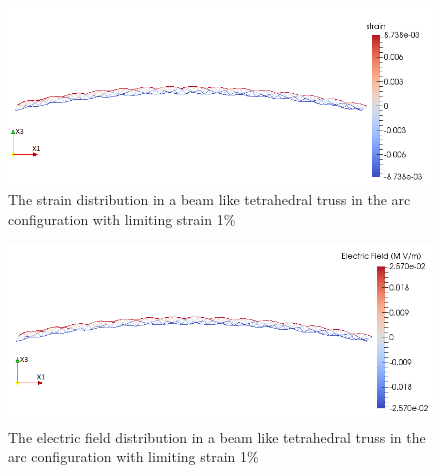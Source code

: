 \begin{figure}  
\centering
\includegraphics[width=6.0in]{./chap_5_active_trusses/images_non_linear_time_dependent_constitutive_equatio/limiting_strain_linear_tetrahedral_bending_strain_contour.png}
\caption{The strain distribution in a beam like tetrahedral truss in the arc configuration with limiting strain 1\%}
\label{fig:limiting_strain_linear_tetrahedral_bending_strain_contour}
\end{figure} 

\begin{figure}  
\centering
\includegraphics[width=6.0in]{./chap_5_active_trusses/images_non_linear_time_dependent_constitutive_equatio/limiting_strain_linear_tetrahedral_bending_electric_field_contour.png}
\caption{The electric field distribution in a beam like tetrahedral truss in the arc configuration with limiting strain 1\%}
\label{fig:limiting_strain_linear_tetrahedral_bending_electric_field_contour} 
\end{figure} 

